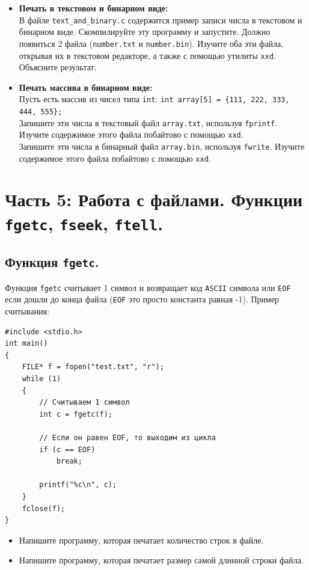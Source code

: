 \documentclass{article}
\begin{document}
\begin{itemize}
\item \textbf{Печать в текстовом и бинарном виде:}\\
В файле \texttt{text\_and\_binary.c} содержится пример записи числа в текстовом и бинарном виде. Скомпилируйте эту программу и запустите. Должно появиться 2 файла (\texttt{number.txt} и \texttt{number.bin}). Изучите оба эти файла, открывая их в текстовом редакторе, а также с помощью утилиты \texttt{xxd}. Объясните результат.


\item \textbf{Печать массива в бинарном виде:}\\
Пусть есть массив из чисел типа \texttt{int}: \texttt{int array[5] = \{111, 222, 333, 444, 555\};}\\
Запишите эти числа в текстовый файл \texttt{array.txt}, используя \texttt{fprintf}. Изучите содержимое этого файла побайтово с помощью \texttt{xxd}.\\
Запишите эти числа в бинарный файл \texttt{array.bin}, используя \texttt{fwrite}. Изучите содержимое этого файла побайтово с помощью \texttt{xxd}.
\end{itemize}


\newpage
\section*{Часть 5: Работа с файлами. Функции \texttt{fgetc}, \texttt{fseek}, \texttt{ftell}.}
\subsection*{Функция \texttt{fgetс}.}
Функция \texttt{fgetc} считывает 1 символ и возвращает код \texttt{ASCII} символа или \texttt{EOF} если дошли до конца файла (\texttt{EOF} это просто константа равная -1). Пример считывания:

\begin{lstlisting}
#include <stdio.h>
int main()
{
    FILE* f = fopen("test.txt", "r");
    while (1)
    {
        // Считываем 1 символ
        int c = fgetc(f);
		
        // Если он равен EOF, то выходим из цикла
        if (c == EOF)
            break;
            
        printf("%c\n", c);
	}
    fclose(f);
}
\end{lstlisting}

\begin{itemize}
\item Напишите программу, которая печатает количество строк в файле.
\item Напишите программу, которая печатает размер самой длинной строки файла.
\end{itemize}
\end{document}
